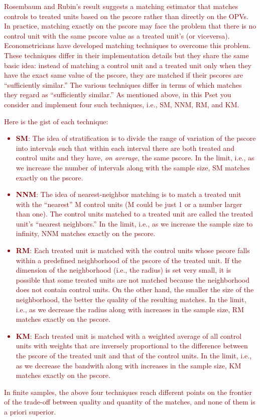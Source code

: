 \noindent \textcolor{Maroon}{Rosembaum and Rubin's result suggests a matching estimator that matches controls to treated units based on the pscore rather than directly on the OPVs. In practice, matching exactly on the pscore may face the problem that there is no control unit with the same pscore value as a treated unit's (or viceversa). Econometricians have developed matching techniques to overcome this problem. These techniques differ in their implementation details but they share the same basic idea: instead of matching a control unit and a treated unit only when they have the exact same value of the pscore, they are matched if their pscores are ``sufficiently similar.'' The various techniques differ in terms of which matches they regard as ``sufficiently similar.'' As mentioned above, in this Pset you consider and implement four such techniques, i.e., SM, NNM, RM, and KM.} \\

\noindent \textcolor{Maroon}{Here is the gist of each technique: 
\begin{itemize}
\item \textbf{SM}: The idea of stratification is to divide the range of variation of the pscore into intervals such that within each interval there are both treated and control units and they have, \textit{on average}, the same pscore. In the limit, i.e., as we increase the number of intervals along with the sample size, SM matches exactly on the pscore. \item \textbf{NNM}: The idea of nearest-neighbor matching is to match a treated unit with the ``nearest'' M control units (M could be just 1 or a number larger than one). The control units matched to a treated unit are called the treated unit's ``nearest neighbors.'' In the limit, i.e., as we increase the sample size to infinity, NNM matches exactly on the pscore. 
\item \textbf{RM}: Each treated unit is matched with the control units whose pscore falls within a predefined neighborhood of the pscore of the treated unit. If the dimension of the neighborhood (i.e., the radius) is set very small, it is possible that some treated units are not matched because the neighborhood does not contain control units. On the other hand, the smaller the size of the neighborhood, the better the quality of the resulting matches. In the limit, i.e., as we decrease the radius along with increases in the sample size, RM matches exactly on the pscore. 
\item \textbf{KM}: Each treated unit is matched with a weighted average of all control units with weights that are inversely proportional to the difference between the pscore of the treated unit and that of the control units. In the limit, i.e., as we decrease the bandwith along with increases in the sample size, KM matches exactly on the pscore.
\end{itemize}
 In finite samples, the above four techniques reach different points on the frontier of the trade-off between quality and quantity of the matches, and none of them is a priori superior.}
